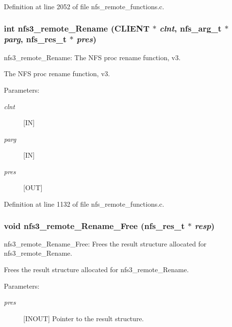 Definition at line 2052 of file nfs\_\-remote\_\-functions.c.
\subsubsection[{nfs3\_\-remote\_\-Rename}]{\setlength{\rightskip}{0pt plus 5cm}int nfs3\_\-remote\_\-Rename (CLIENT $\ast$ {\em clnt}, \/  nfs\_\-arg\_\-t $\ast$ {\em parg}, \/  nfs\_\-res\_\-t $\ast$ {\em pres})}\label{group__NFSprocs_gc4c5cf0eec99981815308f9c52ccb3a5}


nfs3\_\-remote\_\-Rename: The NFS proc rename function, v3.

The NFS proc rename function, v3.

\begin{Desc}
\item[Parameters:]
\begin{description}
\item[{\em clnt}][IN] \item[{\em parg}][IN] \item[{\em pres}][OUT] \end{description}
\end{Desc}


Definition at line 1132 of file nfs\_\-remote\_\-functions.c.
\subsubsection[{nfs3\_\-remote\_\-Rename\_\-Free}]{\setlength{\rightskip}{0pt plus 5cm}void nfs3\_\-remote\_\-Rename\_\-Free (nfs\_\-res\_\-t $\ast$ {\em resp})}\label{group__NFSprocs_g66615d0d81d49408227c56748ef1a7b3}


nfs3\_\-remote\_\-Rename\_\-Free: Frees the result structure allocated for nfs3\_\-remote\_\-Rename.

Frees the result structure allocated for nfs3\_\-remote\_\-Rename.

\begin{Desc}
\item[Parameters:]
\begin{description}
\item[{\em pres}][INOUT] Pointer to the result structure. \end{description}
\end{Desc}


